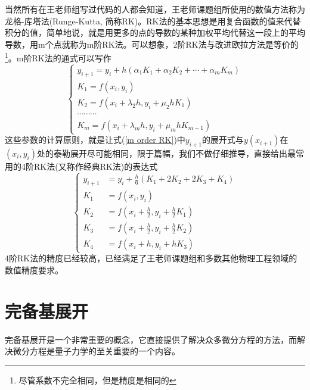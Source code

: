 \documentclass[12pt,a4paper,openany,twoside]{book}
\numberwithin{equation}{section}
\begin{document}
            当然所有在王老师组写过代码的人都会知道，王老师课题组所使用的数值方法称为龙格-库塔法(Runge-Kutta, 简称RK)。RK法的基本思想是用复合函数的值来代替积分的值，简单地说，就是用更多的点的导数的某种加权平均代替这一段上的平均导数，用m个点就称为m阶RK法。可以想象，2阶RK法与改进欧拉方法是等价的\footnote{尽管系数不完全相同，但是精度是相同的}。m阶RK法的通式可以写作
            \begin{equation}
              \left\{\begin{array}{l}
                {y_{i+1}=y_{i}+h\left(\alpha_{1} K_{1}+\alpha_{2} K_{2}+\cdots+\alpha_{m} K_{m}\right)} \\
                {K_{1}=f\left(x_{i}, y_{i}\right)} \\
                {K_{2}=f\left(x_{i}+\lambda_{2} h, y_{i}+\mu_{2} h K_{1}\right)} \\
                {\cdots \cdots \cdots } \\
                {K_{m}=f\left(x_{i}+\lambda_{m} h, y_{i}+\mu_{m} h K_{m-1}\right)}
              \end{array}\right.
              \label{m order RK}
            \end{equation}
            这些参数的计算原则，就是让式(\ref{m order RK})中$y_{i+1}$的展开式与$y(x_{i+1})$在$(x_i,y_i)$处的泰勒展开尽可能相同，限于篇幅，我们不做仔细推导，直接给出最常用的4阶RK法(又称作经典RK法)的表达式
            \begin{equation}
              \left\{\begin{aligned}
                y_{i+1} &=y_{i}+\frac{h}{6}\left(K_{1}+2 K_{2}+2 K_{3}+K_{4}\right) \\
                K_{1} &=f\left(x_{i}, y_{i}\right) \\
                K_{2} &=f\left(x_{i}+\frac{h}{2}, y_{i}+\frac{h}{2} K_{1}\right) \\
                K_{3} &=f\left(x_{i}+\frac{h}{2}, y_{i}+\frac{h}{2} K_{2}\right) \\
                K_{4} &=f\left(x_{i}+h, y_{i}+h K_{3}\right)
              \end{aligned}\right.
              \label{4 order RK}
            \end{equation}
            4阶RK法的精度已经较高，已经满足了王老师课题组和多数其他物理工程领域的数值精度要求。
        \section{完备基展开}
          完备基展开是一个非常重要的概念，它直接提供了解决众多微分方程的方法，而解决微分方程是量子力学的至关重要的一个内容。
\end{document}
